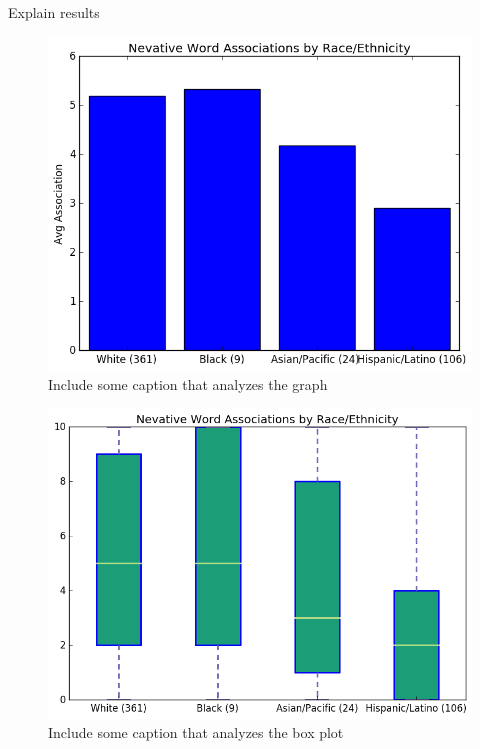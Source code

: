 \documentclass[sigconf]{acmart}
\begin{document}
Explain results

\begin{figure}
\includegraphics[width=\columnwidth]{images/fig1.png}
\caption{Include some caption that analyzes the graph}
\label{Figure 1}
\end{figure}

\begin{figure}
\includegraphics[width=\columnwidth]{images/fig2.png}
\caption{Include some caption that analyzes the box plot}
\label{Figure 2}
\end{figure}
\end{document}
